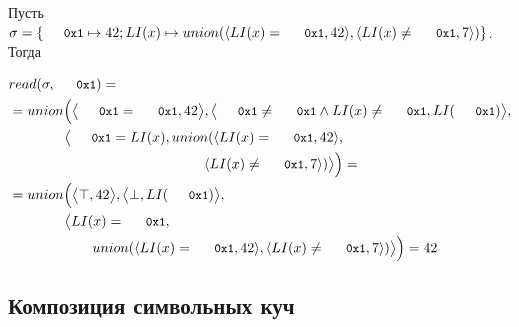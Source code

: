 %
\begin{exmp}

  Пусть $\sigma = \{ \addr{0x1} \mapsto 42; \li{x} \mapsto \aunion(\pair{\mg{\li{x}}{\addr{0x1}}}{42},\pair{\nmg{\li{x}}{\addr{0x1}}}{7}) \}$. Тогда

  \begin{align*}
&\deref{\sigma}{\addr{0x1}}=\\
&=\Union{\paiR{\mg{\addr{0x1}}{\addr{0x1}}}{42},\paiR{\nmg{\addr{0x1}}{\addr{0x1}}\wedge\nmg{\li{x}}{\addr{0x1}}}{\li{\addr{0x1}}},\\
&\qquad\qquad\paiR{\mg{\addr{0x1}}{\li{x}}}{\aunion(\pair{\mg{\li{x}}{\addr{0x1}}}{42},\\
&\qquad\qquad\qquad\qquad\qquad\qquad\qquad\pair{\nmg{\li{x}}{\addr{0x1}}}{7})}}=\\
&=\Union{\paiR{\top}{42},\paiR{\bot}{\li{\addr{0x1}}},\\
&\qquad\qquad\paiR{\mg{\li{x}}{\addr{0x1}}}{\\
&\qquad\qquad\qquad\aunion(\pair{\mg{\li{x}}{\addr{0x1}}}{42},\pair{\nmg{\li{x}}{\addr{0x1}}}{7})}}=42
\end{align*}


\end{exmp}
%

\subsection{Композиция символьных куч}


